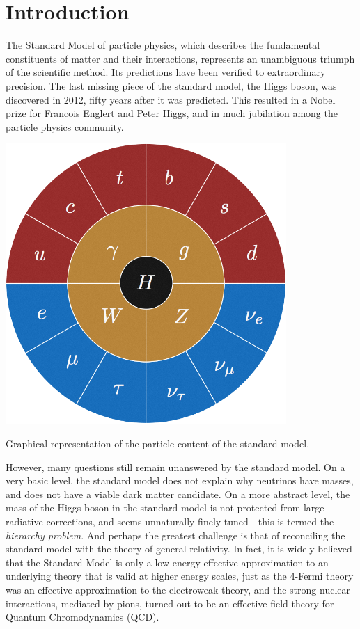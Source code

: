 \chapter{Introduction}\label{ch:introduction}

The Standard Model of particle physics, which describes the fundamental constituents of matter and their interactions, represents an unambiguous triumph of the scientific method. Its predictions have been verified to extraordinary precision. The last missing piece of the standard model, the Higgs boson, was discovered in 2012, fifty years after it was predicted. This resulted in a Nobel prize for Francois Englert and Peter Higgs, and in much jubilation among the particle physics community. 

\begin{marginfigure}[2.5cm]
  \centering
  \includegraphics[width=0.8\textwidth]{images/SM-wheel.png}
  \caption{Graphical representation of the particle content of the standard model.}
\end{marginfigure}

However, many questions still remain unanswered by the standard model. On a very basic level, the standard model does not explain why neutrinos have masses, and does not have a viable dark matter candidate. On a more abstract level, the mass of the Higgs boson in the standard model is not protected from large radiative corrections, and seems unnaturally finely tuned - this is termed the \emph{hierarchy problem}. And perhaps the greatest challenge is that of reconciling the standard model with the theory of general relativity. In fact, it is widely believed that the Standard Model is only a low-energy effective approximation to an underlying theory that is valid at higher energy scales, just as the 4-Fermi theory was an effective approximation to the electroweak theory, and the strong nuclear interactions, mediated by pions, turned out to be an effective field theory for Quantum Chromodynamics (QCD).


